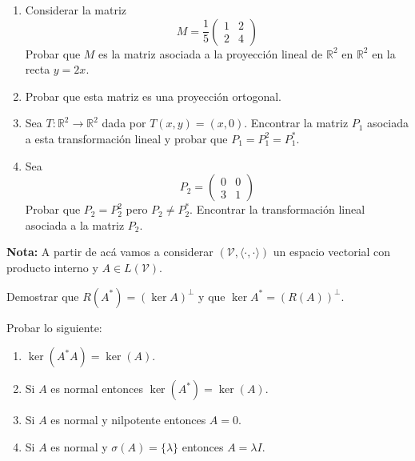 \documentclass{article}
\newcommand{\R}{\mathbb{R}}
\newenvironment{ejercicio}[1]{\begin{trivlist}
\item[\hskip \labelsep {\bfseries Ejercicio}\hskip \labelsep {\bfseries #1.}]}{\end{trivlist}}
\begin{document}
\vspace{0.5cm}

\begin{ejercicio}{3}
    \begin{enumerate}
        \item Considerar la matriz
              \[
                  M = \frac{1}{5}\begin{pmatrix} 1 & 2 \\ 2 & 4 \end{pmatrix}
              \]
              Probar que \(M\) es la matriz asociada a la proyección lineal de \(\R^2\) en \(\R^2\) en la recta \(y=2x\).
        \item Probar que esta matriz es una proyección ortogonal.
        \item Sea \(T:\R^2\to\R^2\) dada por \(T(x,y) = (x,0)\). Encontrar la matriz \(P_1\) asociada a esta transformación lineal y probar que \(P_1 = P_1^2 = P_1^*\).
        \item Sea
              \[
                  P_2 = \begin{pmatrix} 0 & 0 \\ 3 & 1 \end{pmatrix}
              \]
              Probar que \(P_2 = P_2^2\) pero \(P_2 \neq P_2^*\). Encontrar la transformación lineal asociada a la matriz \(P_2\).
    \end{enumerate}
\end{ejercicio}

\vspace{0.5cm}

\noindent \textbf{Nota:} A partir de acá vamos a considerar \((\mathcal{V},\langle\cdot,\cdot\rangle)\) un espacio vectorial con producto interno y \(A\in L(\mathcal{V})\).

\begin{ejercicio}{4}
    Demostrar que \(R(A^*) = {(\ker A)}^\perp\) y que \(\ker A^* = {(R(A))}^\perp\).
\end{ejercicio}

\vspace{0.5cm}

\begin{ejercicio}{5}
    Probar lo siguiente:
    \begin{enumerate}
        \item \(\ker(A^*A) = \ker(A)\).
        \item Si \(A\) es normal entonces \(\ker(A^*) = \ker(A)\).
        \item Si \(A\) es normal y nilpotente entonces \(A=0\).
        \item Si \(A\) es normal y \(\sigma(A) = \{\lambda\}\) entonces \(A=\lambda I\).
    \end{enumerate}
\end{ejercicio}
\end{document}
